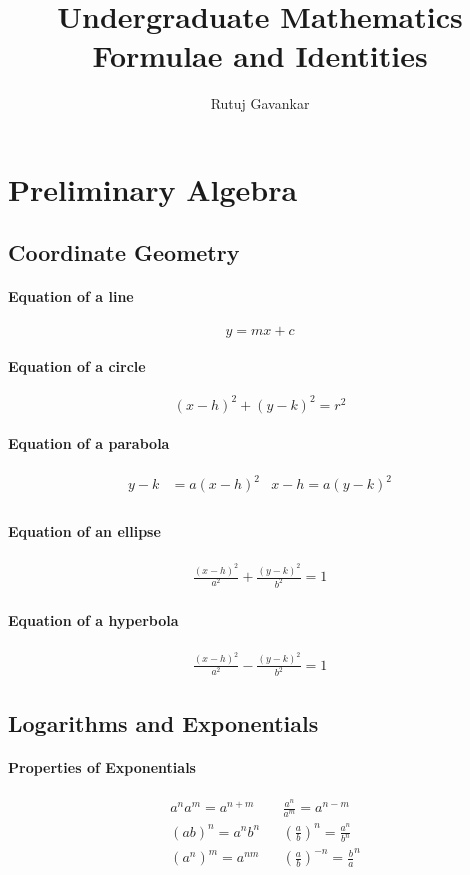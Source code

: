 \documentclass[12pt]{article}
\title{Undergraduate Mathematics Formulae and Identities}
\author{Rutuj Gavankar \\ \email}
\begin{document}
	
	
\maketitle
\tableofcontents
\newpage

\section{Preliminary Algebra}

\subsection{Coordinate Geometry}
\paragraph{Equation of a line}
$$y = mx + c$$
\paragraph{Equation of a circle}
$${(x-h)}^2 + {(y-k)}^2 = r^2$$
\paragraph{Equation of a parabola}
\begin{align*}
y - k &= a{(x-h)}^2 & x-h = a{(y-k)^2} \\
\end{align*}
\paragraph{Equation of an ellipse}
\begin{align*}
\frac{{(x-h)}^2}{a^2} + \frac{{(y-k)}^2}{b^2} = 1 
\end{align*}
\paragraph{Equation of a hyperbola}
\begin{align*}
\frac{{(x-h)}^2}{a^2} - \frac{{(y-k)}^2}{b^2} = 1 
\end{align*}


\subsection{Logarithms and Exponentials}
\paragraph{Properties of Exponentials}
\begin{align*} 
		&a^n a^m = a^{n+m} & &\frac{a^n}{a^m}   = a^{n-m}\\
		&(a b)^n = a^n  b^n & &\left({\frac{a}{b}}\right)^n  = \frac{a^n}{b^n}\\
		&(a^n)^m = a^{n m} & &\left({\frac{a}{b}}\right)^{-n} = {\frac{b}{a}}^{n}\\
\end{align*}
\end{document}
